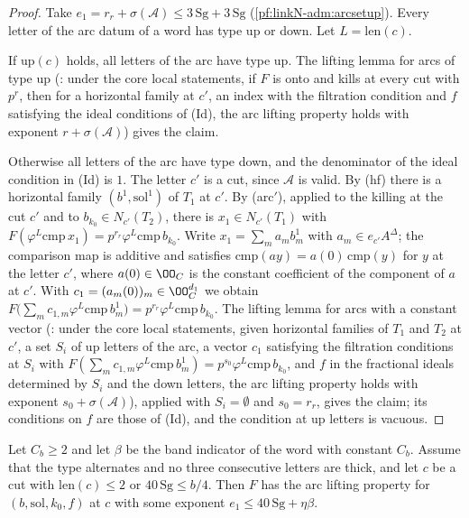 \begin{proof}
Take $e_1=r_r+\sigma(\mathcal A)\le3\,\mathrm{Sg}+3\,\mathrm{Sg}$ (\cref{pf:linkN-adm:arcsetup}). Every letter of the arc
datum of a word has type up or down. Let $L=\mathrm{len}(c)$.

If $\mathrm{up}(c)$ holds, all letters of the arc have type up. The lifting lemma for arcs of type up
(: under the core local statements, if
$F$ is onto and kills at every cut with $p^{r}$, then for a horizontal family at $c'$, an index with the filtration
condition and $f$ satisfying the ideal conditions of (Id), the arc lifting property holds with exponent
$r+\sigma(\mathcal A)$) gives the claim.

Otherwise all letters of the arc have type down, and the denominator of the ideal condition in (Id) is $1$. The letter
$c'$ is a cut, since $\mathcal A$ is valid. By (hf) there is a horizontal family $(b^1,\mathrm{sol}^1)$ of $T_1$ at $c'$. By
(arc$'$), applied to the killing at the cut $c'$ and to $b_{k_0}\in N_{c'}(T_2)$, there is $x_1\in N_{c'}(T_1)$ with
$F(\varphi^L\mathrm{cmp}\,x_1)=p^{r_r}\varphi^L\mathrm{cmp}\,b_{k_0}$. Write $x_1=\sum_ma_mb^1_m$ with $a_m\in e_{c'}A^\Delta$;
the comparison map is additive and satisfies $\mathrm{cmp}(ay)=a(0)\,\mathrm{cmp}(y)$ for $y$ at the letter $c'$, where
$a(0)\in\OO_C$ is the constant coefficient of the component of $a$ at $c'$. With $c_1=(a_m(0))_m\in\OO_C^{d_1}$ we obtain
$F\bigl(\sum_mc_{1,m}\varphi^L\mathrm{cmp}\,b^1_m\bigr)=p^{r_r}\varphi^L\mathrm{cmp}\,b_{k_0}$. The lifting lemma for arcs
with a constant vector (: under the core
local statements, given horizontal families of $T_1$ and $T_2$ at $c'$, a set $S_i$ of up letters of the arc, a vector
$c_1$ satisfying the filtration conditions at $S_i$ with $F(\sum_mc_{1,m}\varphi^L\mathrm{cmp}\,b^1_m)=
p^{s_0}\varphi^L\mathrm{cmp}\,b_{k_0}$, and $f$ in the fractional ideals determined by $S_i$ and the down letters, the arc
lifting property holds with exponent $s_0+\sigma(\mathcal A)$), applied with $S_i=\emptyset$ and $s_0=r_r$, gives the
claim; its conditions on $f$ are those of (Id), and the condition at up letters is vacuous.
\end{proof}

\begin{proposition}\label{pf:linkN-adm:arcalt}
Let $C_b\ge2$ and let $\beta$ be the band indicator of the word with constant $C_b$. Assume that the type alternates and no
three consecutive letters are thick, and let $c$ be a cut with $\mathrm{len}(c)\le2$ or $40\,\mathrm{Sg}\le b/4$. Then $F$
has the arc lifting property for $(b,\mathrm{sol},k_0,f)$ at $c$ with some exponent $e_1\le40\,\mathrm{Sg}+\eta\beta$.
\end{proposition}

